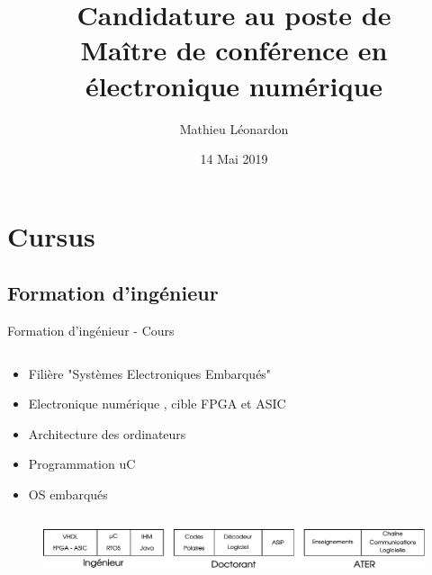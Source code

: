 \documentclass[t,compress,mathserif,12pt,xcolor=dvipsnames]{beamer}
\title{\textbf{Candidature au poste de \\ Maître de conférence en électronique numérique}}
\author[Mathieu Léonardon\hspace{3.01cm}\url{https://mathieuleonardon.com}\hspace{1.0cm}{mathieu.leonardon@ims-bordeaux.fr}]{\Large{Mathieu Léonardon}\vspace{-0.5cm}}
\date{14 Mai 2019}
\begin{document}
\begin{frame}[t]
\titlepage
\end{frame}

\section{Cursus}
\subsection{Formation d'ingénieur}
\begin{frame}[t]{Formation d'ingénieur - Cours}
  \begin{minipage}[t][5.0cm][t]{\textwidth}
    \begin{columns}
      \begin{column}{0.63\textwidth}
        \vspace{-30pt}
        \begin{itemize}
          \item Filière "Systèmes Electroniques Embarqués"
          \item Electronique numérique , cible FPGA et ASIC
          \item Architecture des ordinateurs
          \item Programmation uC
          \item OS embarqués
        \end{itemize}
      \end{column}
      \begin{column}{0.04\textwidth}

      \end{column}
      \begin{column}{0.33\textwidth}
      \end{column}
    \end{columns}
  \end{minipage}
  \begin{figure}[htp]
    \centering
    \includegraphics[width=\textwidth]{fig/frise}
  \end{figure}
\end{frame}
\end{document}
